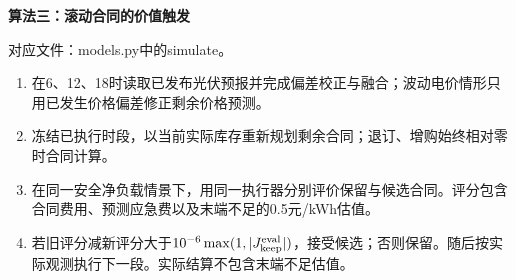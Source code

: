 \noindent\textbf{算法三：滚动合同的价值触发}\par
对应文件：models.py中的simulate。
\begin{enumerate}
\item 在6、12、18时读取已发布光伏预报并完成偏差校正与融合；波动电价情形只用已发生价格偏差修正剩余价格预测。
\item 冻结已执行时段，以当前实际库存重新规划剩余合同；退订、增购始终相对零时合同计算。
\item 在同一安全净负载情景下，用同一执行器分别评价保留与候选合同。评分包含合同费用、预测应急费以及末端不足的0.5元/kWh估值。
\item 若旧评分减新评分大于$10^{-6}\max(1,|J_{\rm keep}^{\rm eval}|)$，接受候选；否则保留。随后按实际观测执行下一段。实际结算不包含末端不足估值。
\end{enumerate}
